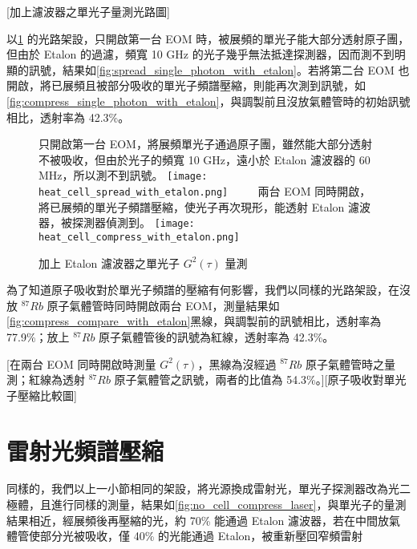 \documentclass[class=NCU_thesis, crop=false]{standalone}
\begin{document}
[加上濾波器之單光子量測光路圖]

以\cref{fig:single_photon_with_etalon} 的光路架設，只開啟第一台 EOM 時，被展頻的單光子能大部分透射原子團，但由於 Etalon 的過濾，頻寬 10 GHz 的光子幾乎無法抵達探測器，因而測不到明顯的訊號，結果如\cref{fig:spread_single_photon_with_etalon}。若將第二台 EOM 也開啟，將已展頻且被部分吸收的單光子頻譜壓縮，則能再次測到訊號，如\cref{fig:compress_single_photon_with_etalon}，與調製前且沒放氣體管時的初始訊號相比，透射率為 42.3\%。

\begin{figure}[!hbt]
    \centering
    \subcaptionbox
        {只開啟第一台 EOM，將展頻單光子通過原子團，雖然能大部分透射不被吸收，但由於光子的頻寬 10 GHz，遠小於 Etalon 濾波器的 60 MHz，所以測不到訊號。
        \label{fig:spread_single_photon_with_etalon}}
        {\texttt{[image: heat\_cell\_spread\_with\_etalon.png]}}
    ~~~~
    \subcaptionbox
        {兩台 EOM 同時開啟，將已展頻的單光子頻譜壓縮，使光子再次現形，能透射 Etalon 濾波器，被探測器偵測到。
        \label{fig:compress_single_photon_with_etalon}}
        {\texttt{[image: heat\_cell\_compress\_with\_etalon.png]}}
    \caption{加上 Etalon 濾波器之單光子 $G^{2}(\tau)$ 量測}
    \label{fig:single_photon_with_etalon}
\end{figure}

為了知道原子吸收對於單光子頻譜的壓縮有何影響，我們以同樣的光路架設，在沒放 $^{87}Rb$ 原子氣體管時同時開啟兩台 EOM，測量結果如\cref{fig:compress_compare_with_etalon}黑線，與調製前的訊號相比，透射率為 77.9\%；放上 $^{87}Rb$ 原子氣體管後的訊號為紅線，透射率為 42.3\%。

[在兩台 EOM 同時開啟時測量 $G^{2}(\tau)$，黑線為沒經過 $^{87}Rb$ 原子氣體管時之量測；紅線為透射 $^{87}Rb$ 原子氣體管之訊號，兩者的比值為 54.3\%。][原子吸收對單光子壓縮比較圖]

\section{雷射光頻譜壓縮}

同樣的，我們以上一小節相同的架設，將光源換成雷射光，單光子探測器改為光二極體，且進行同樣的測量，結果如\cref{fig:no_cell_compress_laser}，與單光子的量測結果相近，經展頻後再壓縮的光，約 70\% 能通過 Etalon 濾波器，若在中間放氣體管使部分光被吸收，僅 40\% 的光能通過 Etalon，被重新壓回窄頻雷射
\end{document}
